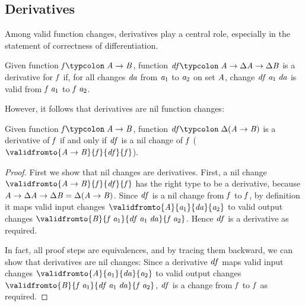 \subsection{Derivatives}
\label{sec:derivative-formal}
Among valid function changes, derivatives play a central role, especially in the
statement of correctness of differentiation.

\begin{definition}[Derivatives]
  \label{def:derivative-raw}
  Given function \ensuremath{\Varid{f}\typcolon\;\Conid{A}\to \Conid{B}}, function \ensuremath{\Varid{df}\typcolon\;\Conid{A}\to \Delta \Conid{A}\to \Delta \Conid{B}} is a
  derivative for \ensuremath{\Varid{f}} if, for all changes \ensuremath{\Varid{da}} from \ensuremath{\Varid{a}_{1}} to \ensuremath{\Varid{a}_{2}} on set \ensuremath{\Conid{A}}, change
  \ensuremath{\Varid{df}\;\Varid{a}_{1}\;\Varid{da}} is valid from \ensuremath{\Varid{f}\;\Varid{a}_{1}} to \ensuremath{\Varid{f}\;\Varid{a}_{2}}.
\end{definition}

However, it follows that derivatives are nil function changes:

\begin{lemma}
  \label{def:derivative}
  Given function \ensuremath{\Varid{f}\typcolon\;\Conid{A}\to \Conid{B}}, function \ensuremath{\Varid{df}\typcolon\;\Delta (\Conid{A}\to \Conid{B})} is a derivative
  of \ensuremath{\Varid{f}} if and only if \ensuremath{\Varid{df}} is a nil change of \ensuremath{\Varid{f}} (\ensuremath{\validfromto{\Conid{A}\to \Conid{B}}{\Varid{f}}{\Varid{df}}{\Varid{f}}}).
\end{lemma}
\begin{proof}
  First we show that nil changes are derivatives.
  First, a nil change \ensuremath{\validfromto{\Conid{A}\to \Conid{B}}{\Varid{f}}{\Varid{df}}{\Varid{f}}} has the right type to be a derivative, because \ensuremath{\Conid{A}\to \Delta \Conid{A}\to \Delta \Conid{B}\mathrel{=}\Delta (\Conid{A}\to \Conid{B})}.
  Since \ensuremath{\Varid{df}} is a nil change from \ensuremath{\Varid{f}} to \ensuremath{\Varid{f}}, by definition it maps valid input changes
  \ensuremath{\validfromto{\Conid{A}}{\Varid{a}_{1}}{\Varid{da}}{\Varid{a}_{2}}} to valid output changes
  \ensuremath{\validfromto{\Conid{B}}{\Varid{f}\;\Varid{a}_{1}}{\Varid{df}\;\Varid{a}_{1}\;\Varid{da}}{\Varid{f}\;\Varid{a}_{2}}}. Hence \ensuremath{\Varid{df}} is a derivative as required.

  In fact, all proof steps are equivalences, and by tracing them backward, we
  can show that derivatives are nil changes: Since a derivative \ensuremath{\Varid{df}} maps valid
  input changes \ensuremath{\validfromto{\Conid{A}}{\Varid{a}_{1}}{\Varid{da}}{\Varid{a}_{2}}} to valid output changes \ensuremath{\validfromto{\Conid{B}}{\Varid{f}\;\Varid{a}_{1}}{\Varid{df}\;\Varid{a}_{1}\;\Varid{da}}{\Varid{f}\;\Varid{a}_{2}}}, \ensuremath{\Varid{df}} is a change from \ensuremath{\Varid{f}} to \ensuremath{\Varid{f}} as required.
\end{proof}

